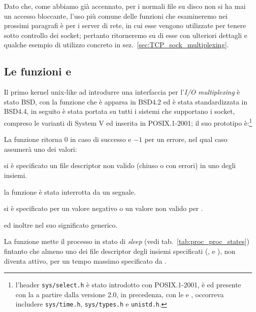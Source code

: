 Dato che, come abbiamo già accennato, per i normali file su disco non si ha
mai un accesso bloccante, l'uso più comune delle funzioni che esamineremo nei
prossimi paragrafi è per i server di rete, in cui esse vengono utilizzate per
tenere sotto controllo dei socket; pertanto ritorneremo su di esse con
ulteriori dettagli e qualche esempio di utilizzo concreto in
sez.~\ref{sec:TCP_sock_multiplexing}.


\subsection{Le funzioni  e }
\label{sec:file_select}

Il primo kernel unix-like ad introdurre una interfaccia per l'\textit{I/O
  multiplexing} è stato BSD, con la funzione  che è apparsa in
BSD4.2 ed è stata standardizzata in BSD4.4, in seguito è stata portata su
tutti i sistemi che supportano i socket, compreso le varianti di System V ed
inserita in POSIX.1-2001; il suo prototipo è:\footnote{l'header
  \texttt{sys/select.h} è stato introdotto con POSIX.1-2001, è ed presente con
  la  a partire dalla versione 2.0, in precedenza, con le
   e , occorreva includere \texttt{sys/time.h},
  \texttt{sys/types.h} e \texttt{unistd.h}.}

\begin{funcproto}{
}
{La funzione ritorna $0$ in caso di successo e $-1$ per un errore, nel qual
  caso  assumerà uno dei valori: 
  \begin{errlist}
  \item[\errcode{EBADF}] si è specificato un file descriptor non valido
    (chiuso o con errori) in uno degli insiemi.
  \item[\errcode{EINTR}] la funzione è stata interrotta da un segnale.
  \item[\errcode{EINVAL}] si è specificato per  un valore negativo
    o un valore non valido per .
  \end{errlist}
  ed inoltre  nel suo significato generico.}
\end{funcproto}

La funzione mette il processo in stato di \textit{sleep} (vedi
tab.~\ref{tab:proc_proc_states}) fintanto che almeno uno dei file descriptor
degli insiemi specificati (,  e
), non diventa attivo, per un tempo massimo specificato da
.

